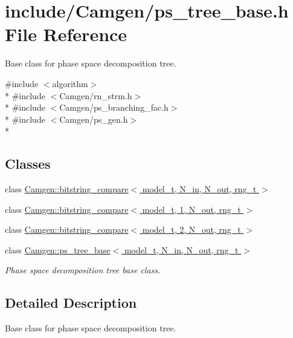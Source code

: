 \hypertarget{a00745}{}\section{include/\+Camgen/ps\+\_\+tree\+\_\+base.h File Reference}
\label{a00745}


Base class for phase space decomposition tree.  


{\ttfamily \#include $<$algorithm$>$}\\*
{\ttfamily \#include $<$Camgen/rn\+\_\+strm.\+h$>$}\\*
{\ttfamily \#include $<$Camgen/ps\+\_\+branching\+\_\+fac.\+h$>$}\\*
{\ttfamily \#include $<$Camgen/ps\+\_\+gen.\+h$>$}\\*
\subsection*{Classes}
\begin{DoxyCompactItemize}
\item 
class \hyperlink{a00024}{Camgen\+::bitstring\+\_\+compare$<$ model\+\_\+t, N\+\_\+in, N\+\_\+out, rng\+\_\+t $>$}
\item 
class \hyperlink{a00025}{Camgen\+::bitstring\+\_\+compare$<$ model\+\_\+t, 1, N\+\_\+out, rng\+\_\+t $>$}
\item 
class \hyperlink{a00026}{Camgen\+::bitstring\+\_\+compare$<$ model\+\_\+t, 2, N\+\_\+out, rng\+\_\+t $>$}
\item 
class \hyperlink{a00458}{Camgen\+::ps\+\_\+tree\+\_\+base$<$ model\+\_\+t, N\+\_\+in, N\+\_\+out, rng\+\_\+t $>$}
\begin{DoxyCompactList}\small\item\em Phase space decomposition tree base class. \end{DoxyCompactList}\end{DoxyCompactItemize}


\subsection{Detailed Description}
Base class for phase space decomposition tree. 

